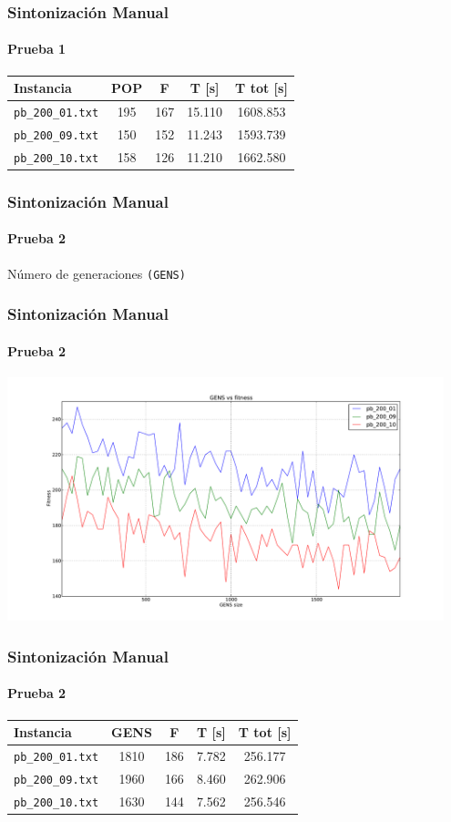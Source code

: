 \frame
{
\frametitle{Sintonización Manual}
\framesubtitle{Prueba 1}
\begin{center}
\begin{tabular}{|l|c|c|c|c|}
    \hline
    \textbf{Instancia} & \textbf{POP} & \textbf{F} & \textbf{T [s] } & \textbf{T tot [s] }\\\hline
    \texttt{pb\_200\_01.txt} & 195 & 167 & 15.110 & 1608.853 \\\hline
    \texttt{pb\_200\_09.txt} & 150 & 152 & 11.243 & 1593.739 \\\hline
    \texttt{pb\_200\_10.txt} & 158 & 126 & 11.210 & 1662.580 \\\hline
\end{tabular}
\end{center}
}


\frame
{
\frametitle{Sintonización Manual}
\framesubtitle{Prueba 2}

\vspace{1cm}
\begin{center}
	Número de generaciones \texttt{(GENS)}
\end{center}
}


\frame
{
\frametitle{Sintonización Manual}
\framesubtitle{Prueba 2}

\begin{center}
	\includegraphics[width=0.95\textwidth]{../doc/img/2.pdf}
\end{center}
}

\frame
{
\frametitle{Sintonización Manual}
\framesubtitle{Prueba 2}
\begin{center}
\begin{tabular}{|l|c|c|c|c|}
    \hline
    \textbf{Instancia} & \textbf{GENS} &\textbf{F} & \textbf{T [s] } & \textbf{T tot [s]}\\\hline
    \texttt{pb\_200\_01.txt} & 1810 & 186 & 7.782 & 256.177 \\\hline
    \texttt{pb\_200\_09.txt} & 1960 & 166 & 8.460 & 262.906 \\\hline
    \texttt{pb\_200\_10.txt} & 1630 & 144 & 7.562 & 256.546 \\\hline
\end{tabular}
\end{center}
}


